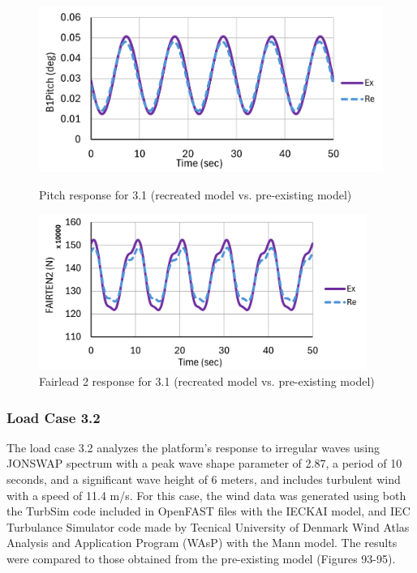 \documentclass[a4paper, 11pt]{article}
\begin{document}
\begin{figure}[H]
    \begin{minipage}{0.48\textwidth}
        \centering
        \includegraphics[width=1\textwidth]{3.1_pitch_mine.png}
        \caption{\small Pitch response for 3.1 (recreated model vs. pre-existing model)}
        \label{fig:3.1_pitch_mine_recreated}
    \end{minipage}
    \hfill
    \begin{minipage}{0.5\textwidth}
        \centering
        \includegraphics[width=0.95\textwidth]{3.1_fairten_mine.png}
        \caption{\small Fairlead 2 response for 3.1 (recreated model vs. pre-existing model)}
        \label{fig:3.1_fairten_mine_recreated}
    \end{minipage}
\end{figure}

\subsubsection{Load Case 3.2}
\hspace*{0.5cm}The load case 3.2 analyzes the platform's response to irregular waves using JONSWAP spectrum with a peak wave shape parameter of 2.87, a period of 10 seconds, and a significant wave height of 6 meters, and includes turbulent wind with a speed of 11.4 m/s. For this case, the wind data was generated using both the TurbSim code included in OpenFAST files with the IECKAI model, and IEC Turbulance Simulator code made by Tecnical University of Denmark Wind Atlas Analysis and Application Program (WAsP) with the Mann model. The results were compared to those obtained from the pre-existing model (Figures 93-95).
\end{document}
